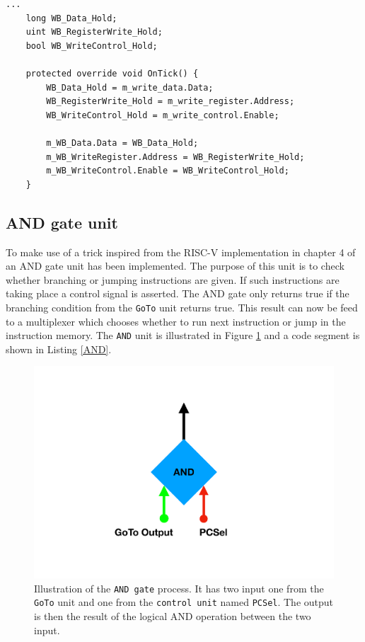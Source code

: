         \begin{minipage}{\linewidth}
            \begin{lstlisting}[language={[Sharp]C}, caption={A slice of the \texttt{Write Back} process SME code. It contains 3 variables, which will hold the incomming values, which gets outputted unchanged in the same clock cycle.},captionpos=b, label = WB]
...
    long WB_Data_Hold;
    uint WB_RegisterWrite_Hold;
    bool WB_WriteControl_Hold;
    
    protected override void OnTick() {
        WB_Data_Hold = m_write_data.Data;
        WB_RegisterWrite_Hold = m_write_register.Address;
        WB_WriteControl_Hold = m_write_control.Enable;
    
        m_WB_Data.Data = WB_Data_Hold;
        m_WB_WriteRegister.Address = WB_RegisterWrite_Hold;
        m_WB_WriteControl.Enable = WB_WriteControl_Hold;
    }
            \end{lstlisting}
        \end{minipage} 
    
    \subsection{AND gate unit}
        To make use of a trick inspired from the RISC-V implementation in chapter 4 of \cite{riscVbook} an AND gate unit has been implemented. The purpose of this unit is to check whether branching or jumping instructions are given. If such instructions are taking place a control signal is asserted. The AND gate only returns true if the branching condition from the \texttt{GoTo} unit returns true. This result can now be feed to a multiplexer which chooses whether to run next instruction or jump in the instruction memory. The \texttt{AND} unit is illustrated in Figure \ref{fig:AND} and a code segment is shown in Listing \ref{AND}.
        
        \begin{figure}[h!]
            \centering
            \includegraphics[scale=0.35]{pictures/AND.pdf}
            \caption{Illustration of the \texttt{AND gate} process. It has two input one from the \texttt{GoTo} unit and one from the \texttt{control unit} named \texttt{PCSel}. The output is then the result of the logical AND operation between the two input.}
            \label{fig:AND}
        \end{figure}
    
